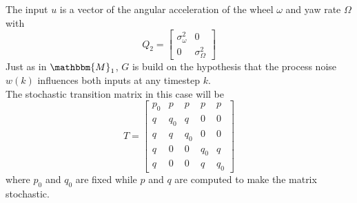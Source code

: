 \documentclass[twocolumn]{article}
\begin{document}
The input $u$ is a vector of the angular acceleration of the wheel $\omega$ and yaw rate $\Omega$ with
\begin{equation*}
    Q_{2}=\begin{bmatrix}
        \sigma^{2}_{\omega}&0\\
        0&\sigma^{2}_{\Omega}
    \end{bmatrix}
\end{equation*}
Just as in $\mathbbm{M}_{1}$, $G$ is build on the hypothesis that the process noise $w(k)$ influences both inputs at any timestep $k$.
\\
The stochastic transition matrix in this case will be 
\begin{equation*}
    T=\begin{bmatrix}
        p_{0}&p&p&p&p\\
        q&q_{0}&q&0&0\\
        q&q&q_{0}&0&0\\
        q&0&0&q_{0}&q\\
        q&0&0&q&q_{0}
    \end{bmatrix}
\end{equation*}
where $p_{0}$ and $q_{0}$ are fixed while $p$ and $q$ are computed to make the matrix stochastic.
\end{document}
